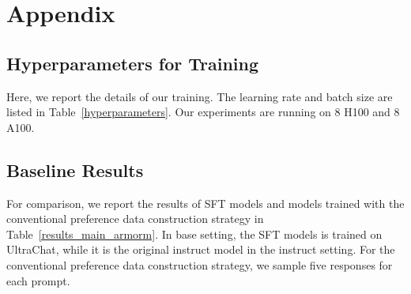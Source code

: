 \section{Appendix}

\subsection{Hyperparameters for Training}
\label{appendix_hyper}

Here, we report the details of our training. 
The learning rate and batch size are listed in Table~\ref{hyperparameters}. 
Our experiments are running on 8 H100 and 8 A100.

\begin{table}[!ht]
\centering
{}
\caption{Hyperparameters for SFT and DPO training.}
\label{hyperparameters}
\end{table}




\subsection{Baseline Results}
\label{baseline}

For comparison, we report the results of SFT models and models trained with the conventional preference data construction strategy in Table~\ref{results_main_armorm}.
In base setting, the SFT models is trained on UltraChat, while it is the original instruct model in the instruct setting.
For the conventional preference data construction strategy, we sample five responses for each prompt.









